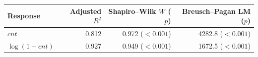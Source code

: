 \begin{tabular}{lrrr}
\toprule
Response & Adjusted $R^2$ & Shapiro--Wilk $W$ ($p$) & Breusch--Pagan LM ($p$) \\
\midrule
$cnt$ & 0.812 & 0.972 ($<0.001$) & 4282.8 ($<0.001$) \\
$\log(1+cnt)$ & 0.927 & 0.949 ($<0.001$) & 1672.5 ($<0.001$) \\
\bottomrule
\end{tabular}
